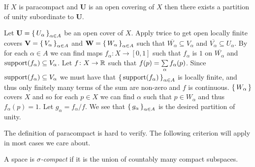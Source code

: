 \documentclass[letterpaper, 11pt, oneside]{book}
\begin{document}
\begin{thrm}
  If $X$ is paracompact and \textbf{U} is an open covering of $X$ then there exists a partition of unity subordinate to \textbf{U}.
\end{thrm}
\begin{pf}
  Let $\textbf{U} = \set{U_{\alpha}}_{\alpha \in A}$ be an open cover of $X$.
  Apply  twice to get open locally finite covers $\textbf{V} = \set{V_{\alpha}}_{\alpha \in A}$ and $\textbf{W} = \set{W_{\alpha}}_{\alpha \in A}$ such that $\overline{W_{\alpha}} \subseteq V_{\alpha}$ and $\overline{V_{\alpha}} \subseteq U_{\alpha}$.
  By  for each $\alpha \in A$ we can find maps $f_{\alpha}\colon X \to [0, 1]$ such that $f_{\alpha}$ is $1$ on $\overline{W_{\alpha}}$ and $\operatorname{support}(f_{\alpha}) \subseteq V_{\alpha}$.
  Let $f\colon X \to \mathbb{R}$ such that $f(p) = \sum\limits_{\alpha}f_{\alpha}(p)$.
  Since $\operatorname{support}(f_{\alpha}) \subseteq V_{\alpha}$ we must have that $\set{\operatorname{support}(f_{\alpha})}_{\alpha \in A}$ is locally finite, and thus only finitely many terms of the sum are non-zero and $f$ is continuous.
  $\set{W_{\alpha}}$ covers $X$ and so for each $p \in X$ we can find $\alpha$ such that $p \in W_{\alpha}$ and thus $f_{\alpha}(p) = 1$.
  Let $g_{\alpha} = f_{\alpha} / f$.
  We see that $\set{g_{\alpha}}_{\alpha \in A}$ is the desired partition of unity.
\end{pf}

The definition of paracompact is hard to verify.
The following criterion will apply in most cases we care about.
\begin{defn}
  A space is \emph{$\sigma$-compact} if it is the union of countably many compact subspaces.
\end{defn}

\clearpage
\end{document}
